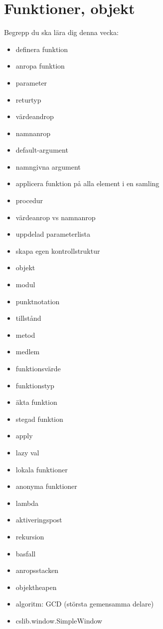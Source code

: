 \chapter{Funktioner, objekt}\label{chapter:W03}
Begrepp du ska lära dig denna vecka:
\begin{multicols}{2}\begin{itemize}[noitemsep,label={$\square$},leftmargin=*]
\item definera funktion
\item anropa funktion
\item parameter
\item returtyp
\item värdeandrop
\item namnanrop
\item default-argument
\item namngivna argument
\item applicera funktion på alla element i en samling
\item procedur
\item värdeanrop vs namnanrop
\item uppdelad parameterlista
\item skapa egen kontrollstruktur
\item objekt
\item modul
\item punktnotation
\item tillstånd
\item metod
\item medlem
\item funktionsvärde
\item funktionstyp
\item äkta funktion
\item stegad funktion
\item apply
\item lazy val
\item lokala funktioner
\item anonyma funktioner
\item lambda
\item aktiveringspost
\item rekursion
\item basfall
\item anropsstacken
\item objektheapen
\item algoritm: GCD (största gemensamma delare)
\item cslib.window.SimpleWindow\end{itemize}\end{multicols}
